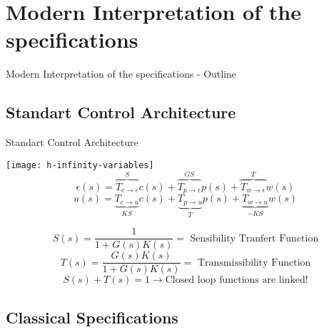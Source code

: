 \documentclass[../main/main.tex]{subfiles}
\begin{document}
\onlyinsubfile{%

}

\section{Modern Interpretation of the specifications}

\begin{frame}{Modern Interpretation of the specifications - Outline}
\end{frame}

\subsection{Standart Control Architecture}

\begin{frame}{Standart Control Architecture}
  \centering
  \begin{overprint}
    \texttt{[image: h-infinity-variables]}
    \[
      \epsilon(s) = \overbrace{T_{c\rightarrow \epsilon}}^{S} c(s) +
      \overbrace{T_{p\rightarrow \epsilon}}^{GS} p(s) +
      \overbrace{T_{w\rightarrow \epsilon}}^{T} w(s)
    \]
    \[
      u(s) = \underbrace{T_{c\rightarrow u}}_{KS} c(s) +
      \underbrace{T_{p\rightarrow u}}_{T} p(s) +
      \underbrace{T_{w\rightarrow u}}_{-KS} w(s)
    \]

    \[ S(s) = \frac{1}{1+G(s)K(s)} = \text{ Sensibility Tranfert Function}\]
    \[ T(s) = \frac{G(s)K(s)}{1+G(s)K(s)} = \text{ Transmissibility Function}\]
    \[ S(s) + T(s) = 1 \rightarrow \text{Closed loop functions are linked!}\]
  \end{overprint}
\end{frame}

\subsection{Classical Specifications}
\end{document}
